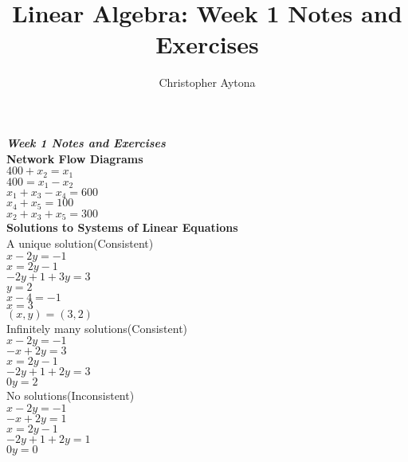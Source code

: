 \documentclass[]{article}
\begin{document}
\title{Linear Algebra: Week 1 Notes and Exercises}
\author{Christopher Aytona}
\emph{\textbf{Week 1 Notes and Exercises}}\\

\textbf{Network Flow Diagrams}\\
$400 + x_2 = x_1$\\
$400 = x_1 - x_2$\\
$x_1 + x_3 - x_4 = 600$\\
$x_4 + x_5 = 100$\\
$x_2 + x_3 + x_5 = 300$\\

\textbf{Solutions to Systems of Linear Equations}\\
\textsf{A unique solution(Consistent)}\\
$x - 2y = -1$\\
$x = 2y-1$\\
$-2y+1+3y = 3$\\
$y = 2$\\
$x - 4 = -1$\\
$x = 3$\\
$(x, y) = (3, 2)$\\
\textsf{Infinitely many solutions(Consistent)}\\
$x - 2y = -1$\\
$-x+2y=3$\\
$x = 2y-1$\\
$-2y+1+2y=3$\\
$0y=2$\\
\textsf{No solutions(Inconsistent)}\\
$x-2y=-1$\\
$-x+2y=1$\\
$x=2y-1$\\
$-2y+1+2y=1$\\
$0y=0$\\
\end{document}
